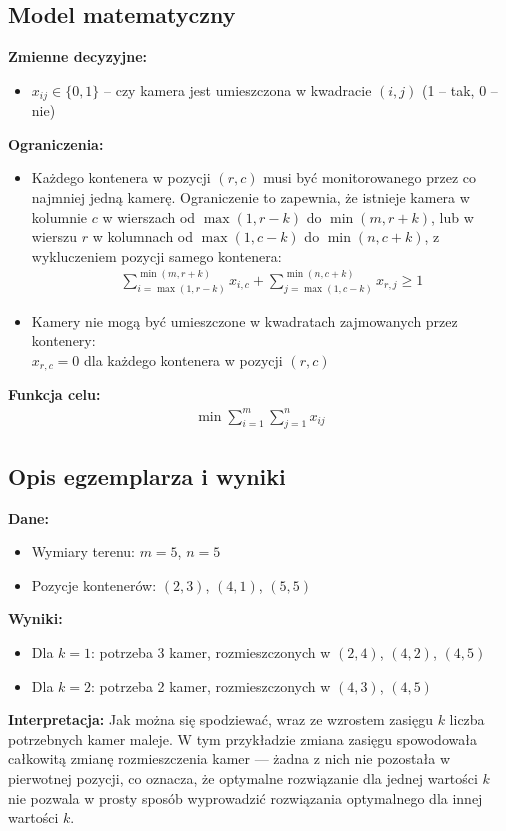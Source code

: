 \documentclass[a4paper,12pt]{article}
\begin{document}
\subsection*{Model matematyczny}

\textbf{Zmienne decyzyjne:}
\begin{itemize}
\item $x_{ij} \in \{0,1\}$ -- czy kamera jest umieszczona w kwadracie $(i,j)$ (1 -- tak, 0 -- nie)
\end{itemize}

\textbf{Ograniczenia:}
\begin{itemize}
\item Każdego kontenera w pozycji $(r,c)$ musi być monitorowanego przez co najmniej jedną kamerę. Ograniczenie to zapewnia, że istnieje kamera w kolumnie $c$ w wierszach od $\max(1, r-k)$ do $\min(m, r+k)$, lub w wierszu $r$ w kolumnach od $\max(1, c-k)$ do $\min(n, c+k)$, z wykluczeniem pozycji samego kontenera: \\
  \begin{align*}
  \sum_{i=\max(1,r-k)}^{\min(m,r+k)} x_{i,c} + \sum_{j=\max(1,c-k)}^{\min(n,c+k)} x_{r,j} \geq 1
  \end{align*}
\item Kamery nie mogą być umieszczone w kwadratach zajmowanych przez kontenery: \\
  $x_{r,c} = 0$ dla każdego kontenera w pozycji $(r,c)$
\end{itemize}

\textbf{Funkcja celu:}
\begin{align*}
\min \sum_{i=1}^{m} \sum_{j=1}^{n} x_{ij}
\end{align*}

\subsection*{Opis egzemplarza i wyniki}

\textbf{Dane:}
\begin{itemize}
\item Wymiary terenu: $m = 5$, $n = 5$
\item Pozycje kontenerów: $(2,3)$, $(4,1)$, $(5,5)$
\end{itemize}

\textbf{Wyniki:}
\begin{itemize}
\item Dla $k=1$: potrzeba 3 kamer, rozmieszczonych w $(2,4)$, $(4,2)$, $(4,5)$
\item Dla $k=2$: potrzeba 2 kamer, rozmieszczonych w $(4,3)$, $(4,5)$
\end{itemize}

\textbf{Interpretacja:} Jak można się spodziewać, wraz ze wzrostem zasięgu $k$ liczba potrzebnych kamer maleje. W tym przykładzie zmiana zasięgu spowodowała całkowitą zmianę rozmieszczenia kamer — żadna z nich nie pozostała w pierwotnej pozycji, co oznacza, że optymalne rozwiązanie dla jednej wartości $k$ nie pozwala w prosty sposób wyprowadzić rozwiązania optymalnego dla innej wartości $k$.
\end{document}
